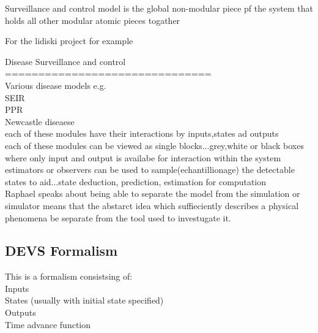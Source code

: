 \documentclass[a4paper, 12pt, notitlepage]{report}
\begin{document}
Surveillance and control model is the global non-modular piece pf the system that holds all other modular atomic pieces togather

For the lidiski project for example 

Disease Surveillance and control \\
===============================\\
Various disease models e.g. \\
SEIR\\
PPR\\
Newcastle diseaese\\

each of these modules have their interactions by inputs,states ad outputs\\

each of these modules can be viewed as single blocks...grey,white or black boxes where only input and output is availabe for interaction within the system\\

estimators or observers can be used to sample(echantillionage) the detectable states to aid...state deduction, prediction, estimation for computation\\

Raphael speaks about being able to separate the model from the simulation or simulator means that the abstarct idea which suffieciently describes a physical  phenomena be separate from the tool used to investugate it. \\

\subsection{DEVS Formalism}
This is a formalism consistsing of:\\
Inputs\\
States (usually with initial state specified)\\
Outputs\\
Time advance function\\
\end{document}

